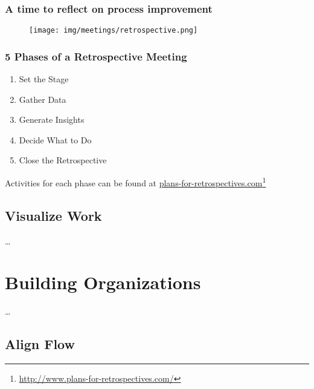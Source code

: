\subsection{A time to reflect on process improvement}
\label{atimetoreflectonprocessimprovement}

\begin{figure}[htbp]
\centering
\texttt{[image: img/meetings/retrospective.png]}
\end{figure}

\subsection{5 Phases of a Retrospective Meeting}
\label{5phasesofaretrospectivemeeting}

\begin{enumerate}
\item Set the Stage

\item Gather Data

\item Generate Insights

\item Decide What to Do

\item Close the Retrospective

\end{enumerate}

Activities for each phase can be found at \href{http://www.plans-for-retrospectives.com/}{plans-for-retrospectives.com}\footnote{\href{http://www.plans-for-retrospectives.com/}{http:/\slash www.plans-for-retrospectives.com\slash }}

\section{Visualize Work}
\label{visualizework}

{\ldots}

\chapter{Building Organizations}
\label{buildingorganizations}

{\ldots}

\section{Align Flow}
\label{alignflow}

